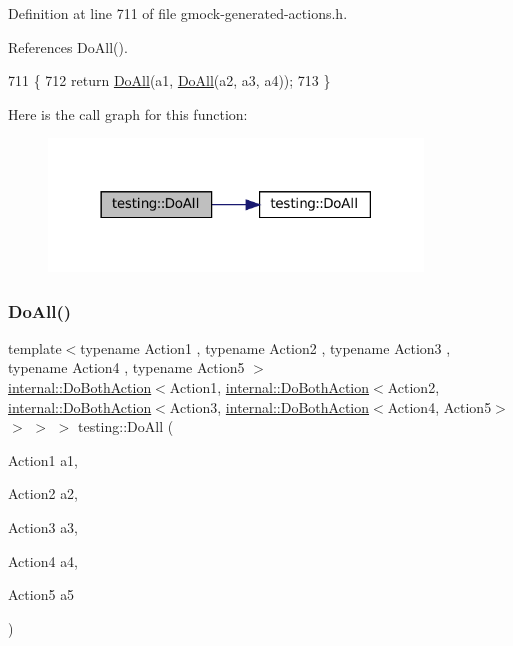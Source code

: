Definition at line 711 of file gmock-\/generated-\/actions.\+h.



References Do\+All().


\begin{DoxyCode}
711                                                       \{
712   \textcolor{keywordflow}{return} \hyperlink{namespacetesting_a79ac222c485c7aa0a1774bee17dadb10}{DoAll}(a1, \hyperlink{namespacetesting_a79ac222c485c7aa0a1774bee17dadb10}{DoAll}(a2, a3, a4));
713 \}
\end{DoxyCode}
Here is the call graph for this function\+:
\nopagebreak
\begin{figure}[H]
\begin{center}
\leavevmode
\includegraphics[width=282pt]{namespacetesting_a790ce08c80a1f8ececa0f2a4f678247c_cgraph}
\end{center}
\end{figure}
\mbox{\label{namespacetesting_a794c41d43373d7af9cebbc7f1c5e4a57}} 
\subsubsection{\texorpdfstring{Do\+All()}{DoAll()}\hspace{0.1cm}{\footnotesize\ttfamily [4/9]}}
{\footnotesize\ttfamily template$<$typename Action1 , typename Action2 , typename Action3 , typename Action4 , typename Action5 $>$ \\
\hyperlink{classtesting_1_1internal_1_1DoBothAction}{internal\+::\+Do\+Both\+Action}$<$Action1, \hyperlink{classtesting_1_1internal_1_1DoBothAction}{internal\+::\+Do\+Both\+Action}$<$Action2, \hyperlink{classtesting_1_1internal_1_1DoBothAction}{internal\+::\+Do\+Both\+Action}$<$Action3, \hyperlink{classtesting_1_1internal_1_1DoBothAction}{internal\+::\+Do\+Both\+Action}$<$Action4, Action5$>$ $>$ $>$ $>$ testing\+::\+Do\+All (\begin{DoxyParamCaption}\item[{Action1}]{a1,  }\item[{Action2}]{a2,  }\item[{Action3}]{a3,  }\item[{Action4}]{a4,  }\item[{Action5}]{a5 }\end{DoxyParamCaption})\hspace{0.3cm}{\ttfamily [inline]}}



